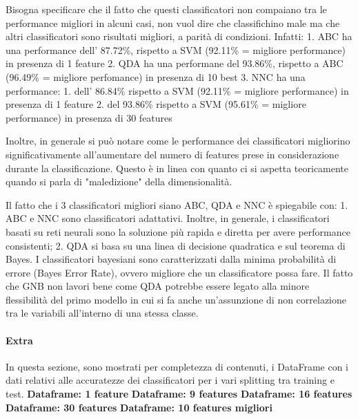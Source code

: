 \documentclass[11pt]{article}
\begin{document}
Bisogna specificare che il fatto che questi classificatori non compaiano
tra le performance migliori in alcuni casi, non vuol dire che
classifichino male ma che altri classificatori sono risultati migliori,
a parità di condizioni. Infatti: 1. ABC ha una performance dell'
87.72\%, rispetto a SVM (92.11\% = migliore performance) in presenza di
1 feature 2. QDA ha una performane del 93.86\%, rispetto a ABC (96.49\%
= migliore perfomance) in presenza di 10 best 3. NNC ha una performance:
1. dell' 86.84\% rispetto a SVM (92.11\% = migliore performance) in
presenza di 1 feature 2. del 93.86\% rispetto a SVM (95.61\% = migliore
performance) in presenza di 30 features

Inoltre, in generale si può notare come le performance dei
classificatori migliorino significativamente all'aumentare del numero di
features prese in considerazione durante la classificazione. Questo è in
linea con quanto ci si aspetta teoricamente quando si parla di
"maledizione" della dimensionalità.

Il fatto che i 3 classificatori migliori siano ABC, QDA e NNC è
spiegabile con: 1. ABC e NNC sono classificatori adattativi. Inoltre, in
generale, i classificatori basati su reti neurali sono la soluzione più
rapida e diretta per avere performance consistenti; 2. QDA si basa su
una linea di decisione quadratica e sul teorema di Bayes. I
classificatori bayesiani sono caratterizzati dalla minima probabilità di
errore (Bayes Error Rate), ovvero migliore che un classificatore possa
fare. Il fatto che GNB non lavori bene come QDA potrebbe essere legato
alla minore flessibilità del primo modello in cui si fa anche
un'assunzione di non correlazione tra le variabili all'interno di una
stessa classe.

    \paragraph{Extra}\label{extra}

    In questa sezione, sono mostrati per completezza di contenuti, i
DataFrame con i dati relativi alle accuratezze dei classificatori per i
vari splitting tra training e test. \textbf{Dataframe: 1 feature}
\textbf{Dataframe: 9 features} \textbf{Dataframe: 16 features}
\textbf{Dataframe: 30 features} \textbf{Dataframe: 10 features migliori}


    
    
    
    
\end{document}

